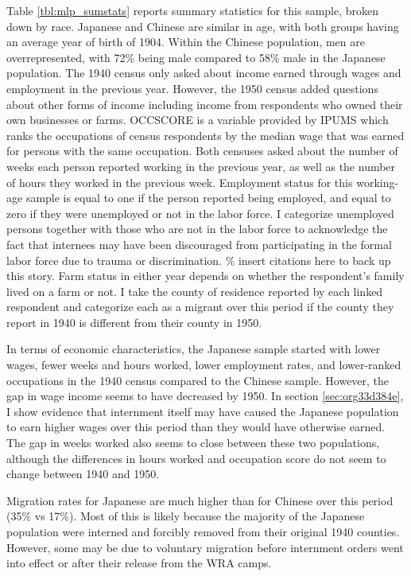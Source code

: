 \documentclass[12pt]{article}
\begin{document}
Table \ref{tbl:mlp_sumstats} reports summary statistics for this sample,
broken down by race.
Japanese and Chinese are similar in age,
with both groups having an average year of birth of 1904.
Within the Chinese population, men are overrepresented,
with 72\% being male compared to 58\% male in the Japanese population.
The 1940 census only asked about income earned through wages and employment
in the previous year.
However, the 1950 census added questions about other forms of income
including income from respondents who owned their own businesses or farms.
OCCSCORE is a variable provided by IPUMS
which ranks the occupations of census respondents
by the median wage that was earned for persons with the same occupation.
Both censuses asked about the number of weeks each person reported working
in the previous year,
as well as the number of hours they worked in the previous week.
Employment status for this working-age sample
is equal to one if the person reported being employed,
and equal to zero if they were unemployed or not in the labor force.
I categorize unemployed persons
together with those who are not in the labor force
to acknowledge the fact that internees may have been discouraged from
participating in the formal labor force due to trauma or discrimination.
\% insert citations here to back up this story.
Farm status in either year depends on whether the respondent's family
lived on a farm or not.
I take the county of residence reported by each linked respondent
and categorize each as a  migrant over this period
if the county they report in 1940 is different from their county in 1950.

In terms of economic characteristics,
the Japanese sample started with lower wages, fewer weeks and hours worked,
lower employment rates,
and lower-ranked occupations in the 1940 census compared to the Chinese sample.
However, the gap in wage income seems to have decreased by 1950.
In section \ref{sec:org33d384e}, I show evidence that
internment itself may have caused the Japanese population to earn higher wages
over this period than they would have otherwise earned.
The gap in weeks worked also seems to close between these two populations,
although the differences in hours worked and occupation score
do not seem to change between 1940 and 1950.

\label{Migration-differences}
Migration rates for Japanese are much higher than for Chinese over this period
(35\% vs 17\%).
Most of this is likely because the majority of the Japanese population
were interned and forcibly removed from their original 1940 counties.
However, some may be due to voluntary migration
before internment orders went into effect
or after their release from the WRA camps.
\end{document}
